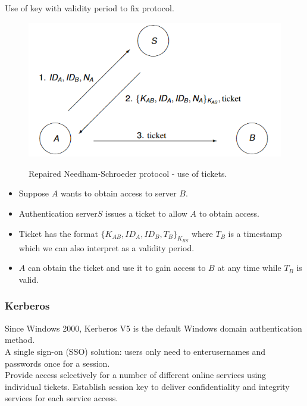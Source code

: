 \documentclass{article}
\begin{document}
Use of key with validity period to fix protocol.\\
\noindent\begin{minipage}{0.6\textwidth}%
\begin{figure}[H]
\centering
\includegraphics[scale=0.72]{Images/needhamschroedertickets.png}
\label{fig:fround}
\caption{Repaired Needham-Schroeder protocol - use of tickets.}
\end{figure}
\end{minipage}%
\hfill%
\begin{minipage}{0.35\textwidth}
\begin{itemize}
    \item Suppose $A$ wants to obtain access to server $B$.
    \item Authentication server$S$ issues a ticket to allow $A$ to obtain access.
    \item Ticket has the format $\{K_{AB}, ID_A, ID_B, T_B\}_{K_{BS}}$ where $T_B$ is a timestamp which we can also interpret as a validity period.
    \item $A$ can obtain the ticket and use it to gain access to $B$ at any time while $T_B$ is valid.
\end{itemize}
\end{minipage}

\subsubsection{Kerberos}\label{Kerberos}

Since Windows 2000, Kerberos V5 is the default Windows domain authentication method. \\
A single sign-on (SSO) solution: users only need to enterusernames and passwords once for a session.\\
Provide access selectively for a number of different online services using individual tickets. Establish session key to deliver confidentiality and integrity services for each service access.
\end{document}
